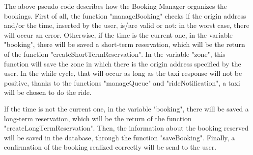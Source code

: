 \vspace{0.5cm}

The above pseudo code describes how the Booking Manager organizes the bookings. 
First of all, the function "manageBooking" checks if the origin address and/or the time, inserted by the user, is/are valid or not: in the worst case, there will occur an error. 
Otherwise, if the time is the current one, in the variable "booking", there will be saved a short-term reservation, which will be the return of the function "createShortTermReservation". In the variable "zone", this function will save the zone in which there is the origin address specified by the user. 
In the while cycle, that will occur as long as the taxi response will not be positive, thanks to the functions "manageQueue" and "rideNotification", a taxi will be chosen to do the ride. 

If the time is not the current one, in the variable "booking", there will be saved a long-term reservation, which will be the return of the function "createLongTermReservation".
Then, the information about the booking reserved will be saved in the database, through the function "saveBooking".
Finally, a confirmation of the booking realized correctly will be send to the user.